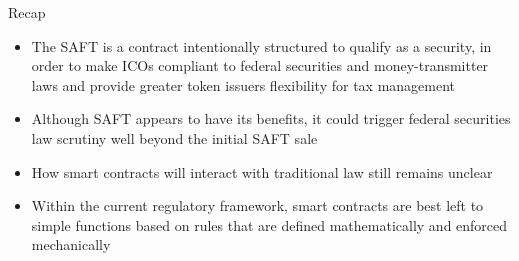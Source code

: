 \documentclass[9pt]{beamer}
\begin{document}
\begin{frame}{Recap}
	\begin{itemize}
		\item The SAFT is a contract intentionally structured to qualify as a security, in order to make ICOs compliant to federal securities and money-transmitter laws and provide greater token issuers flexibility for tax management
		\item Although SAFT appears to have its benefits, it could trigger federal securities law scrutiny well beyond the initial SAFT sale
		\item How smart contracts will interact with traditional law still remains unclear
		\item Within the current regulatory framework, smart contracts are best left to simple functions based on rules that are defined mathematically and enforced mechanically
	\end{itemize}
\end{frame}







\end{document}
